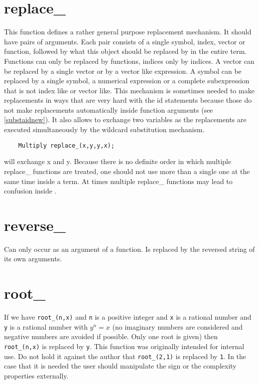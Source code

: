 \section{replace\_}
\label{funreplace}
\noindent This function defines a rather general purpose 
replacement mechanism. It should have pairs of 
arguments. Each pair consists of a single symbol, index, vector or 
function, followed by what this object should be replaced by in the entire 
term. Functions can only be replaced by functions, indices only by indices. 
A vector can be replaced by a single vector or by a vector like expression. 
A symbol can be replaced by a single symbol, a numerical expression or a 
complete subexpression that is not index like or vector like. This 
mechanism is sometimes needed to make replacements in ways that are very 
hard with the id statements because those do not make 
replacements automatically inside function arguments (see 
\ref{substaidnew}). It also allows to exchange two variables as the 
replacements are executed simultaneously by the wildcard substitution 
mechanism.
\begin{verbatim}
    Multiply replace_(x,y,y,x);
\end{verbatim}
will exchange x and y. Because there is no definite order in which multiple 
replace\_ functions are treated, one should not use more than a single one 
at the same time inside a term. At times multiple replace\_ functions may 
lead to confusion inside \FORM.


\section{reverse\_}
\label{funreverse}
\noindent Can only occur as an argument of a function. Is replaced 
by the reversed string of its own arguments.


\section{root\_}
\label{funroot}
\noindent If we have \verb:root_(n,x): and \verb:n: is a positive 
integer and \verb:x: is a rational number and \verb:y: is a rational number 
with $y^n = x$ (no imaginary numbers are considered and negative numbers 
are avoided if possible. Only one root is given) then \verb:root_(n,x): is 
replaced by \verb:y:. This function was originally intended for internal 
use. Do not hold it against the author that \verb:root_(2,1): is replaced 
by \verb:1:. In the case that it is needed the user should manipulate the 
sign or the complexity properties externally.

